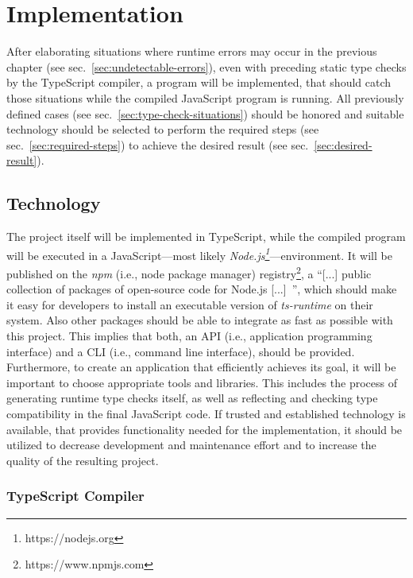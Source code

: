 \chapter{Implementation}
\label{cha:implementation}

After elaborating situations where runtime errors may occur in the previous chapter (see sec.~\ref{sec:undetectable-errors}), even with preceding static type checks by the TypeScript compiler, a program will be implemented, that should catch those situations while the compiled JavaScript program is running. All previously defined cases (see sec.~\ref{sec:type-check-situations}) should be honored and suitable technology should be selected to perform the required steps (see sec.~\ref{sec:required-steps}) to achieve the desired result (see sec.~\ref{sec:desired-result}).

\section{Technology}
\label{sec:technology}

The project itself will be implemented in TypeScript, while the compiled program will be executed in a JavaScript---most likely \emph{Node.js\footnote{https://nodejs.org}}---environment. It will be published on the \emph{npm} (i.e., node package manager) registry\footnote{https://www.npmjs.com}, a ``[...] public collection of packages of open-source code for Node.js [...]~\cite{npmjs:about}'', which should make it easy for developers to install an executable version of \emph{ts-runtime} on their system. Also other packages should be able to integrate as fast as possible with this project. This implies that both, an API (i.e., application programming interface) and a CLI (i.e., command line interface), should be provided. Furthermore, to create an application that efficiently achieves its goal, it will be important to choose appropriate tools and libraries. This includes the process of generating runtime type checks itself, as well as reflecting and checking type compatibility in the final JavaScript code. If trusted and established technology is available, that provides functionality needed for the implementation, it should be utilized to decrease development and maintenance effort and to increase the quality of the resulting project.

\subsection{TypeScript Compiler}
\label{sec:typescript-compiler}

